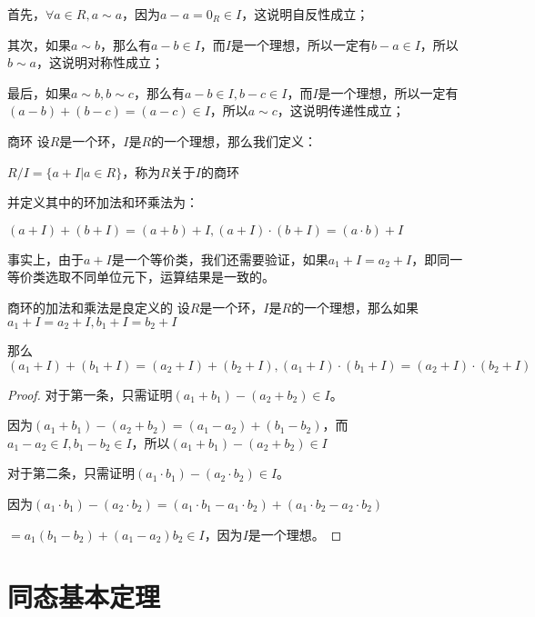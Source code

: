 \documentclass[12pt, a4paper, oneside, UTF8]{ctexbook}
\begin{document}
			首先，$\forall a \in R,a \sim a$，因为$a-a=0_R \in I$，这说明自反性成立；

			其次，如果$a \sim b$，那么有$a-b \in I$，而$I$是一个理想，所以一定有$b-a \in I$，所以$b \sim a$，这说明对称性成立；

			最后，如果$a \sim b,b \sim c$，那么有$a-b \in I,b-c \in I$，而$I$是一个理想，所以一定有$(a-b)+(b-c)=(a-c) \in I$，所以$a \sim c$，这说明传递性成立；
			\begin{defn}{商环}{}
				设$R$是一个环，$I$是$R$的一个理想，那么我们定义：

				$R/I = \{a +I | a \in R\}$，称为$R$关于$I$的商环

				并定义其中的环加法和环乘法为：

				$(a+I)+(b+I)=(a+b)+I,(a+I)\cdot(b+I)=(a\cdot b)+I$
			\end{defn}
			事实上，由于$a+I$是一个等价类，我们还需要验证，如果$a_1+I=a_2+I$，即同一等价类选取不同单位元下，运算结果是一致的。
			\begin{proposition}{商环的加法和乘法是良定义的}{}
				设$R$是一个环，$I$是$R$的一个理想，那么如果$a_1+I=a_2+I,b_1+I=b_2+I$

				那么$(a_1+I)+(b_1+I)=(a_2+I)+(b_2+I),(a_1+I)\cdot (b_1+I)=(a_2+I)\cdot (b_2+I)$
			\end{proposition}
			\begin{proof}
				对于第一条，只需证明$(a_1+b_1)-(a_2+b_2) \in I$。

				因为$(a_1+b_1)-(a_2+b_2)=(a_1-a_2)+(b_1-b_2)$，而$a_1-a_2 \in I,b_1-b_2 \in I$，所以$(a_1+b_1)-(a_2+b_2) \in I$
				
				对于第二条，只需证明$(a_1\cdot b_1)-(a_2\cdot b_2) \in I$。

				因为$(a_1\cdot b_1)-(a_2\cdot b_2)=(a_1\cdot b_1-a_1\cdot b_2)+(a_1\cdot b_2-a_2\cdot b_2)$

				$=a_1(b_1-b_2)+(a_1-a_2)b_2 \in I$，因为$I$是一个理想。
			\end{proof}
	\section{同态基本定理}
\end{document}
